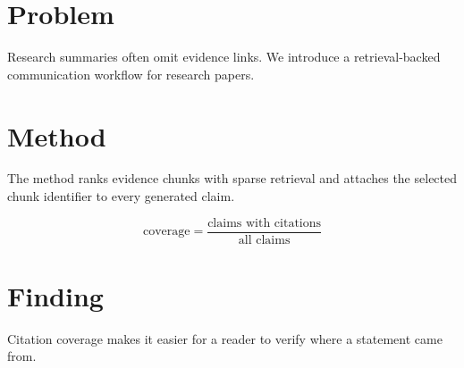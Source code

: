 \section{Problem}

Research summaries often omit evidence links. We introduce a retrieval-backed communication workflow for research papers.

\section{Method}

The method ranks evidence chunks with sparse retrieval and attaches the selected chunk identifier to every generated claim.

\[
\mathrm{coverage} = \frac{\text{claims with citations}}{\text{all claims}}
\]

\section{Finding}

Citation coverage makes it easier for a reader to verify where a statement came from.

